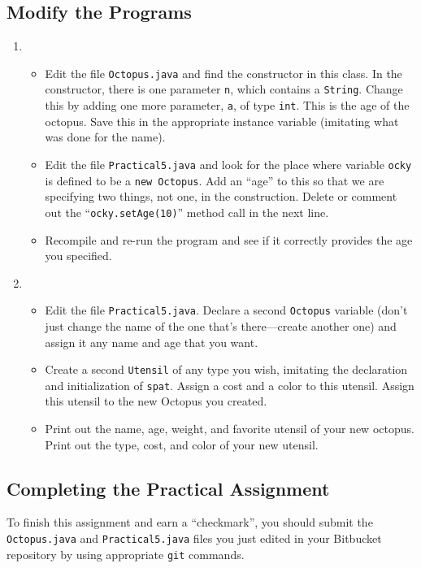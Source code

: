 \vspace*{-.15in}
\subsection*{Modify the Programs} 
\vspace*{-.05in}
\begin{enumerate}
\item 
\begin{itemize}
\item 
Edit the file {\tt Octopus.java} and find the constructor in this class. In the constructor,
there is one parameter {\tt n}, which contains a {\tt String}. 
Change this by adding one more parameter, {\tt a}, of type {\tt int}.
This is the age of the octopus. Save this in the appropriate instance
variable (imitating what was done for the name). 
\item 
\noindent Edit the file {\tt Practical5.java} and look for the place where variable
{\tt ocky} is defined to be a {\tt new Octopus}. Add an ``age'' to this
so that we are specifying two things, not one, in the construction.
Delete or comment out the ``{\tt ocky.setAge(10)}'' method call in the next line. 
\item 
\noindent Recompile and re-run the program and see if it correctly provides the age
you specified.
\end{itemize} \newpage
\item 
\begin{itemize}
\item
Edit the file {\tt Practical5.java}. Declare a second {\tt Octopus} variable (don't
just change the name of the one that's there---create another one) and
assign it any name and age that you want. 
\item
\noindent Create a second {\tt Utensil} of any type you wish, imitating the declaration and
initialization of {\tt spat}.
Assign a cost and a color to this utensil. Assign this utensil to the new
Octopus you created. 
\item
\noindent Print out the name, age, weight, and favorite utensil of your new octopus.
Print out the type, cost, and color of your new utensil.
\end{itemize}
\end{enumerate}

\vspace*{-.15in}
\subsection*{Completing the Practical Assignment}
\vspace*{-.1in}
To finish this assignment and earn a ``checkmark'', you should 
submit the {\tt Octopus.java} and {\tt Practical5.java} files you just edited
in your Bitbucket repository by
using appropriate {\tt git} commands.

